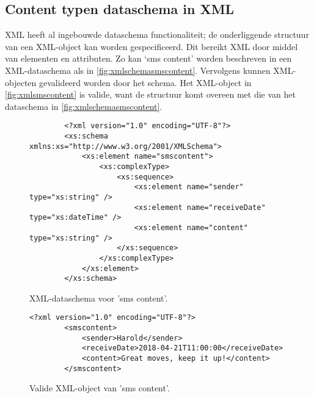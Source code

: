 \begin{appendices}
    \chapter{Content typen dataschema in XML}
    \label{app:contenttypeschemeinxml}
    XML heeft al ingebouwde dataschema functionaliteit; de onderliggende structuur van een XML-object kan worden gespecificeerd. Dit bereikt XML door middel van elementen en attributen. Zo kan ‘sms content’ worden beschreven in een XML-dataschema als in \autoref{fig:xmlschemasmscontent}. Vervolgens kunnen XML-objecten gevalideerd worden door het schema. Het XML-object in \autoref{fig:xmlsmscontent} is valide, want de structuur komt overeen met die van het dataschema in \autoref{fig:xmlschemasmscontent}.

    \begin{figure}[htb]
        \centering
        \begin{lstlisting}
        <?xml version="1.0" encoding="UTF-8"?>
        <xs:schema xmlns:xs="http://www.w3.org/2001/XMLSchema">
            <xs:element name="smscontent">
                <xs:complexType>
                    <xs:sequence>
                        <xs:element name="sender" type="xs:string" />
                        <xs:element name="receiveDate" type="xs:dateTime" />
                        <xs:element name="content" type="xs:string" />
                    </xs:sequence>
                </xs:complexType>
            </xs:element>
        </xs:schema>                
        \end{lstlisting}
        \caption{XML-dataschema voor 'sms content'.}
        \label{fig:xmlschemasmscontent}
    \end{figure}

    \begin{figure}[htb]
        \centering
        \lstset{language=XML}
        \begin{lstlisting}[firstnumber=1]
        <?xml version="1.0" encoding="UTF-8"?>
        <smscontent>
            <sender>Harold</sender>
            <receiveDate>2018-04-21T11:00:00</receiveDate>
            <content>Great moves, keep it up!</content>
        </smscontent>              
        \end{lstlisting}
        \caption{Valide XML-object van 'sms content'.}
        \label{fig:xmlsmscontent}
    \end{figure}

    
    
\end{appendices}